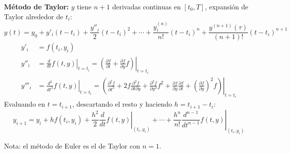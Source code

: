 \documentclass[9pt, aspectratio=169]{beamer}
\begin{document}
\begin{frame}
    \textbf{Método de Taylor:} $y$ tiene $n+1$ derivadas continuas en $[t_0, T]$, expansión de Taylor alrededor de $t_i$:
    \[ y(t) = y_0 + y'_i (t-t_i) + \frac{y''_i}{2}(t-t_i)^2 + \cdots + \frac{y^{(n)}_i}{n!} (t-t_i)^n + \frac{y^{(n+1)}(\tau)}{(n+1)!} (t-t_i)^{n+1} \]
\begin{align*}
    y'_i &= f(t_i, y_i) \\
    y''_i &= \left. \frac{d}{dt} f(t, y) \right|_{t = t_i} = \left. \left(\frac{\partial f}{\partial t} + \frac{\partial f}{\partial y} f \right) \right|_{t = t_i} \\
    y'''_i &= \left. \frac{d^2}{dt^2} f(t, y) \right|_{t = t_i} = \left. \left( \frac{\partial^2f}{\partial t^2} + 2 f \frac{\partial^2 f}{\partial t \partial y} + \frac{\partial^2 f}{\partial y^2} f^2 + \frac{\partial f}{\partial y} \frac{\partial f}{\partial t} + \left(\frac{\partial f}{\partial y} \right)^2 f \right) \right|_{t=t_i}
\end{align*}
Evaluando en $t=t_{i+1}$, descartando el resto y haciendo $h = t_{i+1} - t_i$:
\[ y_{i+1} = y_i + h f(t_i, y_i) + \frac{h^2}{2} \left. \frac{d}{dt} f(t, y) \right|_{(t_i, y_i)} + \cdots + \frac{h^n}{n!} \left. \frac{d^{n-1}}{dt^{n-1}} f(t, y) \right|_{(t_i, y_i)} \] 
        
        {\centering \alert{Nota:} el método de Euler es el de Taylor con $n = 1$. }
\end{frame}
\end{document}
